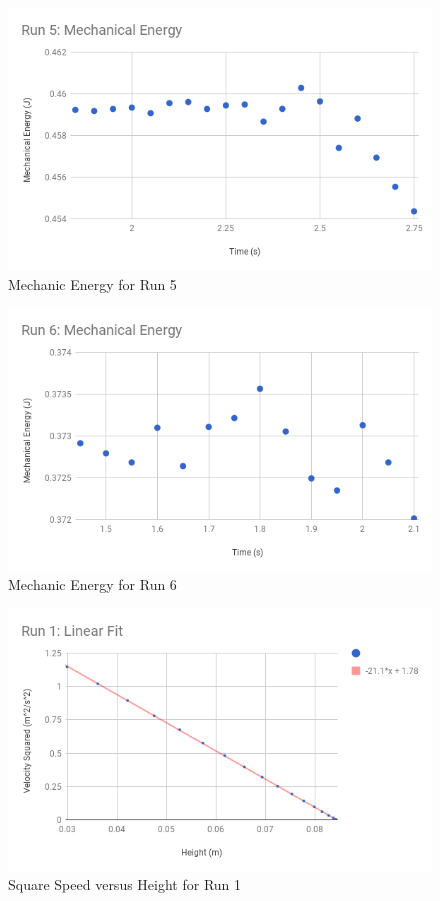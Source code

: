 \begin{figure}[ht]
    \centering
    \includegraphics[scale=0.71]{image/07-mechanic/run-5-energy.png}
    \caption{Mechanic Energy for Run 5}
    \label{figure.07.run.5.e}
\end{figure}
\begin{figure}[ht]
    \centering
    \includegraphics[scale=0.71]{image/07-mechanic/run-6-energy.png}
    \caption{Mechanic Energy for Run 6}
    \label{figure.07.run.6.e}
\end{figure}
\begin{figure}[ht]
    \centering
    \includegraphics[scale=0.71]{image/07-mechanic/run-1-fit.png}
    \caption{Square Speed versus Height for Run 1}
    \label{figure.07.run.1.fit}
\end{figure}
